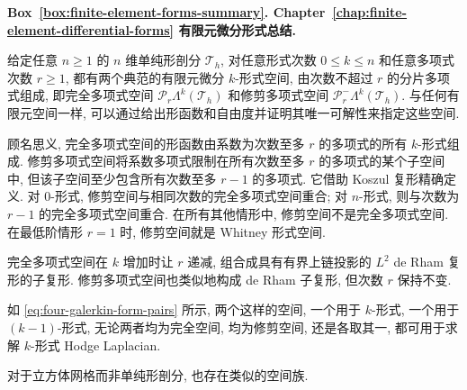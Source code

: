 \label{box:finite-element-forms-summary}
\begin{MBSourceBox}
\textbf{Box~\ref{box:finite-element-forms-summary}. {Chapter~\ref{chap:finite-element-differential-forms} 有限元微分形式总结.}}

{给定任意 $n\geq1$ 的 $n$ 维单纯形剖分 $\mathcal T_h$, 对任意形式次数 $0\leq k\leq n$ 和任意多项式次数 $r\geq1$, 都有两个典范的有限元微分 $k$-形式空间, 由次数不超过 $r$ 的分片多项式组成, 即完全多项式空间 $\mathcal P_r\Lambda^k(\mathcal T_h)$ 和修剪多项式空间 $\mathcal P_r^-\Lambda^k(\mathcal T_h)$. 与任何有限元空间一样, 可以通过给出形函数和自由度并证明其唯一可解性来指定这些空间.}

{顾名思义, 完全多项式空间的形函数由系数为次数至多 $r$ 的多项式的所有 $k$-形式组成. 修剪多项式空间将系数多项式限制在所有次数至多 $r$ 的多项式的某个子空间中, 但该子空间至少包含所有次数至多 $r-1$ 的多项式. 它借助 Koszul 复形精确定义. 对 0-形式, 修剪空间与相同次数的完全多项式空间重合; 对 $n$-形式, 则与次数为 $r-1$ 的完全多项式空间重合. 在所有其他情形中, 修剪空间不是完全多项式空间. 在最低阶情形 $r=1$ 时, 修剪空间就是 Whitney 形式空间.}

{完全多项式空间在 $k$ 增加时让 $r$ 递减, 组合成具有有界上链投影的 $L^2$ de Rham 复形的子复形. 修剪多项式空间也类似地构成 de Rham 子复形, 但次数 $r$ 保持不变.}

{如 \eqref{eq:four-galerkin-form-pairs} 所示, 两个这样的空间, 一个用于 $k$-形式, 一个用于 $(k-1)$-形式, 无论两者均为完全空间, 均为修剪空间, 还是各取其一, 都可用于求解 $k$-形式 Hodge Laplacian.}

{对于立方体网格而非单纯形剖分, 也存在类似的空间族.}
\end{MBSourceBox}
\par\endgroup
